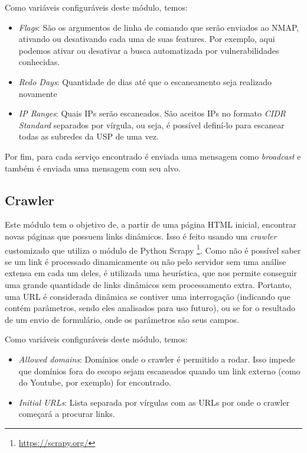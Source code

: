     Como variáveis configuráveis deste módulo, temos:
    \begin{itemize}
        \item \emph{Flags}: São os argumentos de linha de comando que serão enviados ao NMAP, ativando ou desativando cada uma de suas features. Por exemplo, aqui podemos ativar ou desativar a busca automatizada por vulnerabilidades conhecidas.
        \item \emph{Redo Days}: Quantidade de dias até que o escaneamento seja realizado novamente
        \item \emph{IP Ranges}: Quais IPs serão escaneados. São aceitos IPs no formato \textit{CIDR Standard} separados por vírgula, ou seja, é possível definí-lo para escanear todas as subredes da USP de uma vez.
    \end{itemize}
    
    Por fim, para cada serviço encontrado é enviada uma mensagem como \textit{broadcast} e também é enviada uma mensagem com seu alvo.
    
    \subsection{Crawler}
    Este módulo tem o objetivo de, a partir de uma página HTML inicial, encontrar novas páginas que possuem links dinâmicos. Isso é feito usando um \textit{crawler} customizado que utiliza o módulo de Python Scrapy \footnote{\url{https://scrapy.org/}}. Como não é possível saber se um link é processado dinamicamente ou não pelo servidor sem uma análise extensa em cada um deles, é utilizada uma heurística, que nos permite conseguir uma grande quantidade de links dinâmicos sem processamento extra. Portanto, uma URL é considerada dinâmica se contiver uma interrogação (indicando que contém parâmetros, sendo eles analisados para uso futuro), ou se for o resultado de um envio de formulário, onde os parâmetros são seus campos. 
    
    Como variáveis configuráveis deste módulo, temos:
    \begin{itemize}
        \item \emph{Allowed domains}: Domínios onde o crawler é permitido a rodar. Isso impede que domínios fora do escopo sejam escaneados quando um link externo (como do Youtube, por exemplo) for encontrado.
        \item \emph{Initial URLs}: Lista separada por vírgulas com as URLs por onde o crawler começará a procurar links. 
    \end{itemize}
    
